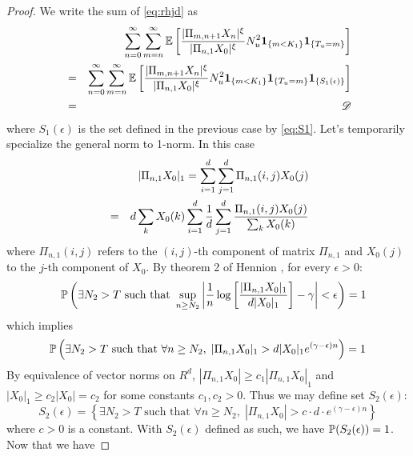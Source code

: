 \documentclass[aoas,preprint]{imsart}
\numberwithin{equation}{section}
\theoremstyle{plain}
\begin{document}
\begin{proof}
  We write the sum of \eqref{eq:rhjd} as
  \begin{eqnarray}
    &&
    \sum_{n=0}^\infty \sum_{m=n}^\infty
    \E \left[
      {
        |\Pi_{m, n+1} X_n |^{\xi}
        \over
        |\Pi_{n, 1} X_0 |^{\xi}        
      }
      N_u^2
      \1{m < K_1}
      \1{T_u = m}
    \right] \nonumber \\
    &=&
    \sum_{n=0}^\infty \sum_{m=n}^\infty
    \E \left[
      {
        |\Pi_{m, n+1} X_n |^{\xi}
        \over
        |\Pi_{n, 1} X_0 |^{\xi}        
      }
      N_u^2
      \1{m < K_1} \1{T_u = m} \1{S_1(\epsilon)}
      \right] \label{eq:pkce} \\
    &=& \mathscr D \nonumber
  \end{eqnarray}
  where $S_1(\epsilon)$ is the set defined in the previous case by
  \eqref{eq:S1}. Let's temporarily specialize the general norm to
  1-norm. In this case
  \begin{eqnarray*}
    &&
    |\Pi_{n, 1} X_0|_1 = \sum_{i=1}^d \sum_{j=1}^d \Pi_{n, 1}(i, j)
    X_0(j) \\
    &=&
    d \sum_{k} X_0(k)
    \sum_{i=1}^d {1 \over d}
    \sum_{j=1}^d
    {
      \Pi_{n, 1}(i, j) X_0(j)
      \over
      \sum_{k} X_0(k)      
    }
  \end{eqnarray*}
  where $\Pi_{n, 1}(i, j)$ refers to the $(i, j)$-th component of
  matrix $\Pi_{n, 1}$ and $X_0(j)$ to the $j$-th component of $X_0$.
  By theorem 2 of Hennion \cite{hennion:1997}, for every
  $\epsilon > 0$:
  \begin{eqnarray*}
    &&
    \P \left(
    \exists N_2 > T \text{ such that }
      \sup_{n \geq N_2}
      \left|
        {1 \over n} \log \left[
          {|\Pi_{n, 1} X_0|_1 \over d |X_0|_1}
        \right]
        - \gamma
        \right|
        < \epsilon
    \right) = 1
  \end{eqnarray*}
  which implies
  \[
    \P \left(
    \exists N_2 > T \text{ such that }
      \forall n \geq N_2,\;
      |\Pi_{n, 1} X_0|_1 > d |X_0|_1 e^{(\gamma - \epsilon) n}
    \right) = 1
  \]
  By equivalence of vector norms on $R^d$,
  $|\Pi_{n, 1} X_0| \geq c_1 | \Pi_{n, 1} X_0|_1$ and
  $|X_0|_1 \geq c_2 |X_0| = c_2$
  for some constants $c_1, c_2 > 0$. Thus we may define set
  $S_2(\epsilon)$:
  \[
  S_2(\epsilon) = \left\{
  \exists N_2 > T \text{ such that }
    \forall n \geq N_2,\;
    |\Pi_{n, 1} X_0| > c \cdot d \cdot e^{(\gamma - \epsilon) n}
  \right\}
  \]
  where $c > 0$ is a constant. With $S_2(\epsilon)$ defined as such,
  we have $\P(S_2(\epsilon)) = 1$. Now that we have

\end{proof}
\end{document}
